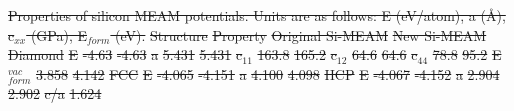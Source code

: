 \documentclass[review]{elsarticle}
\providecommand{\DIFdeltex}[1]{{\protect\color{red}\sout{#1}}}                      %
\providecommand{\DIFdelbegin}{} %
\providecommand{\DIFdelFL}[1]{\DIFdel{#1}} %
\providecommand{\DIFdel}[1]{\texorpdfstring{\DIFdeltex{#1}}{}} %
\newcommand{\DIFscaledelfig}{0.5}
\newlength{\DIFdelgraphicswidth} %
\newlength{\DIFdelgraphicsheight} %
\newcommand{\DIFdelincludegraphics}[2][]{%
\sbox{\DIFdelgraphicsbox}{\DIFOincludegraphics[#1]{#2}}%
\settoboxwidth{\DIFdelgraphicswidth}{\DIFdelgraphicsbox} %
\settoboxtotalheight{\DIFdelgraphicsheight}{\DIFdelgraphicsbox} %
\scalebox{\DIFscaledelfig}{%
\parbox[b]{\DIFdelgraphicswidth}{\usebox{\DIFdelgraphicsbox}\\[-\baselineskip] \rule{\DIFdelgraphicswidth}{0em}}\llap{\resizebox{\DIFdelgraphicswidth}{\DIFdelgraphicsheight}{%
\setlength{\unitlength}{\DIFdelgraphicswidth}%
\begin{picture}(1,1)%
\thicklines\linethickness{2pt} %
{\color[rgb]{1,0,0}\put(0,0){\framebox(1,1){}}}%
{\color[rgb]{1,0,0}\put(0,0){\line( 1,1){1}}}%
{\color[rgb]{1,0,0}\put(0,1){\line(1,-1){1}}}%
\end{picture}%
}\hspace*{3pt}}} %
} %
\DeclareRobustCommand{\DIFdelbegin}{\DIFOdelbegin \let\includegraphics\DIFdelincludegraphics} %
\begin{document}
\DIFdelbegin %
{%
\DIFdelFL{Properties of silicon MEAM potentials.  Units are as follows: E (eV/atom), a (\AA), c$_{xx}$ (GPa), E$_{form}$ (eV).     }}%
\DIFdelFL{Structure }%
\DIFdelFL{Property }%
\DIFdelFL{Original Si-MEAM  }%
\DIFdelFL{New Si-MEAM }%
\DIFdelFL{Diamond }%
\DIFdelFL{E }%
\DIFdelFL{-4.63 }%
\DIFdelFL{-4.63 }%
\DIFdelFL{a }%
\DIFdelFL{5.431 }%
\DIFdelFL{5.431  }%
\DIFdelFL{c$_{11}$ }%
\DIFdelFL{163.8 }%
\DIFdelFL{165.2 }%
\DIFdelFL{c$_{12}$  }%
\DIFdelFL{64.6 }%
\DIFdelFL{64.6 }%
\DIFdelFL{c$_{44}$ }%
\DIFdelFL{78.8	}%
\DIFdelFL{95.2 }%
\DIFdelFL{E$_{form}^{vac}$ }%
\DIFdelFL{3.858 }%
\DIFdelFL{4.142 }%
\DIFdelFL{FCC }%
\DIFdelFL{E }%
\DIFdelFL{-4.065 }%
\DIFdelFL{-4.151 }%
\DIFdelFL{a }%
\DIFdelFL{4.100 }%
\DIFdelFL{4.098 }%
\DIFdelFL{HCP }%
\DIFdelFL{E }%
\DIFdelFL{-4.067 }%
\DIFdelFL{-4.152 }%
\DIFdelFL{a }%
\DIFdelFL{2.904 }%
\DIFdelFL{2.902 }%
\DIFdelFL{c/a }%
\DIFdelFL{1.624 }%
\end{document}
